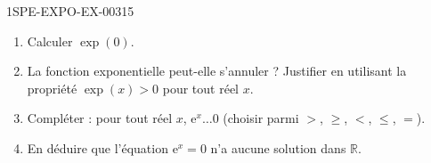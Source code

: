\begin{exercice}{1SPE-EXPO-EX-003}{1}{5}
\begin{enumerate}
\item Calculer $\exp(0)$.
\item La fonction exponentielle peut-elle s'annuler ? Justifier en utilisant la propriété $\exp(x) > 0$ pour tout réel $x$.
\item Compléter : pour tout réel $x$, $\mathrm{e}^x \ldots 0$ (choisir parmi $>$, $\geqslant$, $<$, $\leqslant$, $=$).
\item En déduire que l'équation $\mathrm{e}^x = 0$ n'a aucune solution dans $\mathbb{R}$.
\end{enumerate}
\end{exercice}
